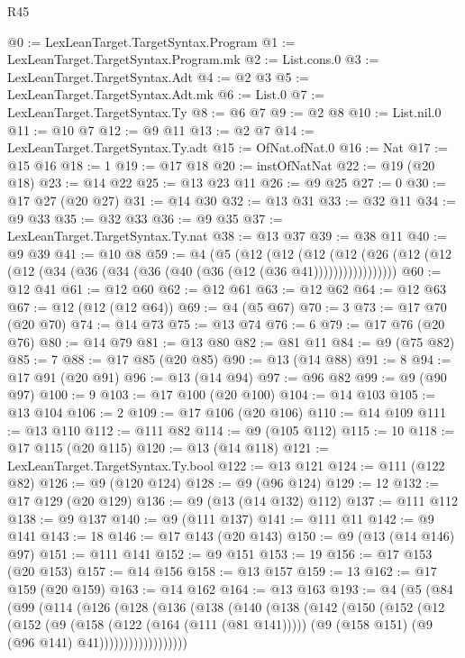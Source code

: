 \begin{lexlean}{R45}
\begin{coremodule}
@0 := LexLeanTarget.TargetSyntax.Program
@1 := LexLeanTarget.TargetSyntax.Program.mk
@2 := List.cons.{0}
@3 := LexLeanTarget.TargetSyntax.Adt
@4 := @2 @3
@5 := LexLeanTarget.TargetSyntax.Adt.mk
@6 := List.{0}
@7 := LexLeanTarget.TargetSyntax.Ty
@8 := @6 @7
@9 := @2 @8
@10 := List.nil.{0}
@11 := @10 @7
@12 := @9 @11
@13 := @2 @7
@14 := LexLeanTarget.TargetSyntax.Ty.adt
@15 := OfNat.ofNat.{0}
@16 := Nat
@17 := @15 @16
@18 := 1
@19 := @17 @18
@20 := instOfNatNat
@22 := @19 (@20 @18)
@23 := @14 @22
@25 := @13 @23 @11
@26 := @9 @25
@27 := 0
@30 := @17 @27 (@20 @27)
@31 := @14 @30
@32 := @13 @31
@33 := @32 @11
@34 := @9 @33
@35 := @32 @33
@36 := @9 @35
@37 := LexLeanTarget.TargetSyntax.Ty.nat
@38 := @13 @37
@39 := @38 @11
@40 := @9 @39
@41 := @10 @8
@59 := @4
    (@5
      (@12
        (@12
          (@12 (@12 (@26 (@12 (@12 (@12 (@34 (@36 (@34 (@36 (@40 (@36 (@12 (@36 @41)))))))))))))))))
@60 := @12 @41
@61 := @12 @60
@62 := @12 @61
@63 := @12 @62
@64 := @12 @63
@67 := @12 (@12 (@12 @64))
@69 := @4 (@5 @67)
@70 := 3
@73 := @17 @70 (@20 @70)
@74 := @14 @73
@75 := @13 @74
@76 := 6
@79 := @17 @76 (@20 @76)
@80 := @14 @79
@81 := @13 @80
@82 := @81 @11
@84 := @9 (@75 @82)
@85 := 7
@88 := @17 @85 (@20 @85)
@90 := @13 (@14 @88)
@91 := 8
@94 := @17 @91 (@20 @91)
@96 := @13 (@14 @94)
@97 := @96 @82
@99 := @9 (@90 @97)
@100 := 9
@103 := @17 @100 (@20 @100)
@104 := @14 @103
@105 := @13 @104
@106 := 2
@109 := @17 @106 (@20 @106)
@110 := @14 @109
@111 := @13 @110
@112 := @111 @82
@114 := @9 (@105 @112)
@115 := 10
@118 := @17 @115 (@20 @115)
@120 := @13 (@14 @118)
@121 := LexLeanTarget.TargetSyntax.Ty.bool
@122 := @13 @121
@124 := @111 (@122 @82)
@126 := @9 (@120 @124)
@128 := @9 (@96 @124)
@129 := 12
@132 := @17 @129 (@20 @129)
@136 := @9 (@13 (@14 @132) @112)
@137 := @111 @112
@138 := @9 @137
@140 := @9 (@111 @137)
@141 := @111 @11
@142 := @9 @141
@143 := 18
@146 := @17 @143 (@20 @143)
@150 := @9 (@13 (@14 @146) @97)
@151 := @111 @141
@152 := @9 @151
@153 := 19
@156 := @17 @153 (@20 @153)
@157 := @14 @156
@158 := @13 @157
@159 := 13
@162 := @17 @159 (@20 @159)
@163 := @14 @162
@164 := @13 @163
@193 := @4
    (@5
      (@84
        (@99
          (@114
            (@126
              (@128
                (@136
                  (@138
                    (@140
                      (@138
                        (@142
                          (@150
                            (@152
                              (@12
                                (@152
                                  (@9
                                    (@158 (@122 (@164 (@111 (@81 @141)))))
                                    (@9 (@158 @151) (@9 (@96 @141) @41))))))))))))))))))

\end{coremodule}
\end{lexlean}
